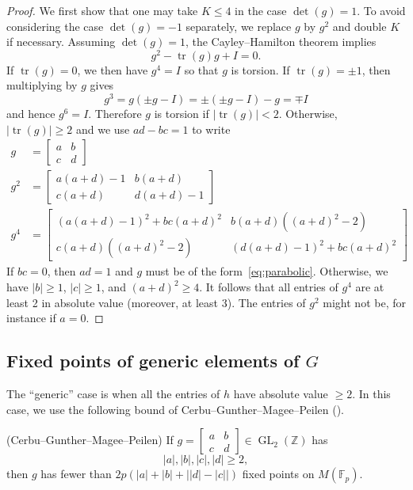 \documentclass[AHL, Unicode, longabstracts, published]{cedram}
\newcommand{\Z}{\mathbb{Z}}
\newcommand{\F}{\mathbb{F}}
\DeclareMathOperator{\tr}{tr}
\DeclareMathOperator{\GL}{GL}
\DeclareMathOperator{\GL}{GL}
\newcommand{\Z}{\mathbb{Z}}
\begin{document}
\begin{proof}
We first show that one may take $K \leq 4$ in the case $\det(g) = 1$. To avoid considering the case $\det(g)=-1$ separately, we replace $g$ by $g^2$ and double $K$ if necessary. Assuming $\det(g)=1$, the Cayley--Hamilton theorem implies
\[
g^2 - \tr(g)g + I = 0.
\]
If $\tr(g) = 0$, we then have $g^4 = I$ so that $g$ is torsion. If $\tr(g) = \pm 1$, then multiplying by $g$ gives
\[
g^3 = g(\pm g - I) = \pm (\pm g - I) - g = \mp I
\]
and hence $g^6 = I$. Therefore $g$ is torsion if $| \tr(g)| < 2$. Otherwise, $|\tr(g)| \geq 2$ and we use $ad-bc = 1$ to write
\begin{align*}
g &=
\begin{bmatrix} a & b \\ c & d
\end{bmatrix} \\
g^2 &=
\begin{bmatrix} a(a+d)-1 & b(a+d) \\ c(a+d) & d(a+d)-1
\end{bmatrix} \\
g^4 &=
\begin{bmatrix} (a(a+d)-1)^2 + bc(a+d)^2 & b(a+d)((a+d)^2 - 2) \\ c(a+d)((a+d)^2 -2) & (d(a+d)-1)^2 + bc(a+d)^2
\end{bmatrix}
\end{align*}
If $bc=0$, then $ad=1$ and $g$ must be of the form~\eqref{eq:parabolic}. Otherwise, we have $|b|\geq 1$, $|c| \geq 1$, and $(a+d)^2 \geq 4$. It follows that all entries of $g^4$ are at least 2 in absolute value (moreover, at least 3). The entries of $g^2$ might not be, for instance if $a=0$.
\end{proof}


\subsection{Fixed points of generic elements of \texorpdfstring{$G$}{G}}
The ``generic'' case is when all the entries of $h$ have absolute value $\geq2$. In this case, we use the following bound of Cerbu--Gunther--Magee--Peilen (\cite[Lemma~3.9]{CGMP}).

\begin{lemm}\label{lem:cgmp}(Cerbu--Gunther--Magee--Peilen)
If $g=\left[
\begin{smallmatrix}a & b\\
c & d
\end{smallmatrix}\right]\in\GL_{2}(\Z)$ has
\[
|a|,|b|,|c|,|d| \geq 2,
\]
then $g$ has fewer than $2p(|a|+|b|+\big||d|-|c||)$ fixed points on $M(\F_{p})$.
\end{lemm}
\end{document}
